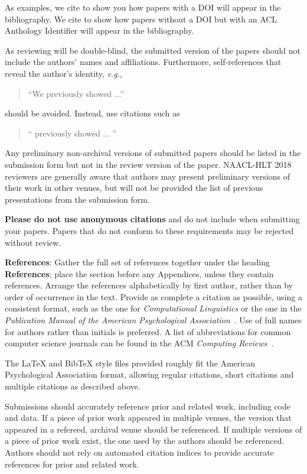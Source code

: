 \documentclass[11pt,a4paper]{article}
\begin{document}
As examples, we cite \cite{P16-1001} to show you how papers with a DOI
will appear in the bibliography.  We cite \cite{C14-1001} to show how
papers without a DOI but with an ACL Anthology Identifier will appear
in the bibliography.  

As reviewing will be double-blind, the submitted version of the papers
should not include the authors' names and affiliations. Furthermore,
self-references that reveal the author's identity, {\em e.g.},
\begin{quote}
``We previously showed \cite{Gusfield:97} ...''  
\end{quote}
should be avoided. Instead, use citations such as 
\begin{quote}
``\citeauthor{Gusfield:97} 
previously showed ... ''
\end{quote}

Any preliminary non-archival versions of submitted papers should be listed in the submission form but not in the review version of the paper. NAACL-HLT 2018 reviewers are generally aware that authors may present preliminary versions of their work in other venues, but will not be provided the list of previous presentations from the submission form. 


\textbf{Please do not use anonymous citations} and do not include
 when submitting your papers. Papers that do not
conform to these requirements may be rejected without review.

\textbf{References}: Gather the full set of references together under
the heading {\bf References}; place the section before any Appendices,
unless they contain references. Arrange the references alphabetically
by first author, rather than by order of occurrence in the text.
Provide as complete a citation as possible, using a consistent format,
such as the one for {\em Computational Linguistics\/} or the one in the 
{\em Publication Manual of the American 
Psychological Association\/}~\cite{APA:83}. Use of full names for
authors rather than initials is preferred. A list of abbreviations
for common computer science journals can be found in the ACM 
{\em Computing Reviews\/}~\cite{ACM:83}.

The \LaTeX{} and Bib\TeX{} style files provided roughly fit the
American Psychological Association format, allowing regular citations, 
short citations and multiple citations as described above.

Submissions should accurately reference prior and related work, including code and data. If a piece of prior work appeared in multiple venues, the version that appeared in a refereed, archival venue should be referenced. If multiple versions of a piece of prior work exist, the one used by the authors should be referenced. Authors should not rely on automated citation indices to provide accurate references for prior and related work.
\end{document}
